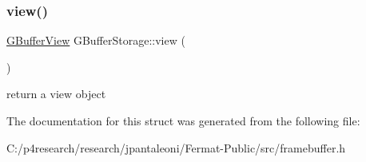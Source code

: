 \subsubsection{\texorpdfstring{view()}{view()}}
{\footnotesize\ttfamily \hyperlink{struct_g_buffer_view}{G\+Buffer\+View} G\+Buffer\+Storage\+::view (\begin{DoxyParamCaption}{ }\end{DoxyParamCaption})\hspace{0.3cm}{\ttfamily [inline]}}

return a view object 

The documentation for this struct was generated from the following file\+:\begin{DoxyCompactItemize}
\item 
C\+:/p4research/research/jpantaleoni/\+Fermat-\/\+Public/src/framebuffer.\+h\end{DoxyCompactItemize}
